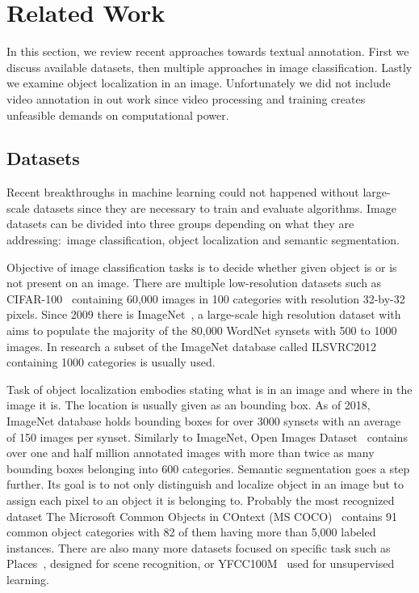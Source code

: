 \chapter{Related Work}
In this section, we review recent approaches towards textual annotation. First we discuss available datasets, then multiple approaches in image classification. Lastly we examine object localization in an image. Unfortunately we did not include video annotation in out work since video processing and training creates unfeasible demands on computational power.


\section*{Datasets}
Recent breakthroughs in machine learning could not happened without large-scale datasets since they are necessary to train and evaluate algorithms. Image datasets can be divided into three groups depending on what they are addressing:~image classification, object localization and semantic segmentation.

Objective of image classification tasks is to decide whether given object is or is not present on an image. There are multiple low-resolution datasets such as CIFAR-100~\cite{krizhevsky2009learning} containing 60,000 images in 100 categories with resolution 32-by-32 pixels. Since 2009 there is ImageNet~\cite{ILSVRC15}, a large-scale high resolution dataset with aims to populate the majority of the 80,000 WordNet synsets with 500 to 1000 images. In research a subset of the ImageNet database called ILSVRC2012 containing 1000 categories is usually used.

Task of object localization embodies stating what is in an image and where in the image it is. The location is usually given as an bounding box. As of 2018, ImageNet database holds bounding boxes for over 3000 synsets with an average of 150 images per synset. Similarly to ImageNet, Open Images Dataset~\cite{openimages} contains over one and half million annotated images with more than twice as many bounding boxes belonging into 600 categories. Semantic segmentation goes a step further. Its goal is to not only distinguish and localize object in an image but to assign each pixel to an object it is belonging to. Probably the most recognized dataset The Microsoft Common Objects in COntext (MS COCO)~\cite{lin2014microsoft} contains 91 common object categories with 82 of them having more than 5,000 labeled instances. There are also many more datasets focused on specific task such as Places~\cite{zhou2017places}, designed for scene recognition, or YFCC100M~\cite{YFCC100M} used for unsupervised learning.

